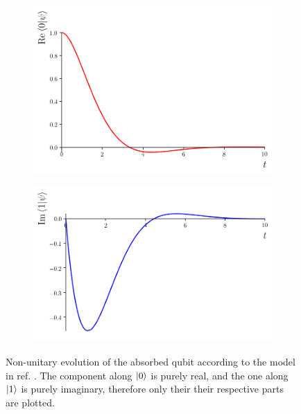 \begin{figure} %
  \centering
  \begin{subfigure}{0.49\textwidth}
    \includegraphics[width=\linewidth]{img/2ldetect/re_psi0_t.png}
    \subcaption{}\label{fig:absorbed-qubit-components:re0}
  \end{subfigure}
  \begin{subfigure}{0.49\textwidth}
    \includegraphics[width=\linewidth]{img/2ldetect/im_psi1_t.png}
    \subcaption{}\label{fig:absorbed-qubit-components:im1}
  \end{subfigure}
  \caption{
    Non-unitary evolution of the absorbed qubit
    according to the model in
    ref. \cite[sec.``Emission from a two-level system'']{RuschhauptAbsorption}.
    The component along $\ket{0}$ is purely real,
    and the one along $\ket{1}$ is purely imaginary,
    therefore only their their respective parts are plotted.
  }\label{fig:absorbed-qubit-components}
\end{figure}

